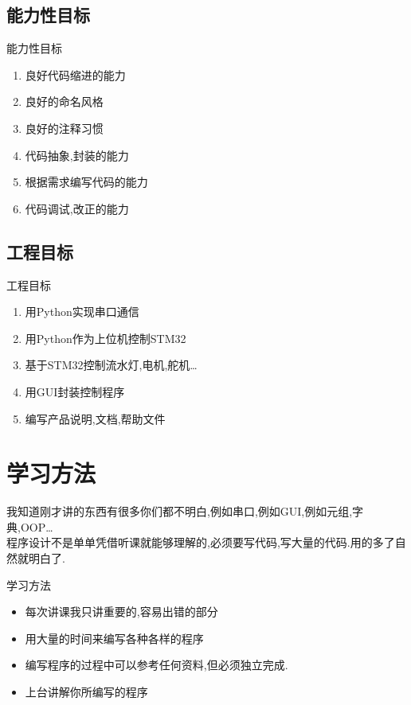 \documentclass{beamer}
\begin{document}
\subsection{能力性目标}
\begin{frame}{能力性目标}
\begin{enumerate}
\item 良好代码缩进的能力
\item 良好的命名风格
\item 良好的注释习惯
\item 代码抽象,封装的能力
\item 根据需求编写代码的能力
\item 代码调试,改正的能力

\end{enumerate}
\end{frame}

\subsection{工程目标}

\begin{frame}{工程目标}
\begin{enumerate}
\item 用Python实现串口通信
\item 用Python作为上位机控制STM32
\item 基于STM32控制流水灯,电机,舵机\dots
\item 用GUI封装控制程序
\item 编写产品说明,文档,帮助文件
\end{enumerate}
\end{frame}

\section{学习方法}
\begin{frame}
我知道刚才讲的东西有很多你们都不明白,例如串口,例如GUI,例如元组,字典,OOP\dots\\

程序设计不是单单凭借听课就能够理解的,必须要写代码,写大量的代码.用的多了自然就明白了.
\end{frame}

\begin{frame}{学习方法}
\begin{itemize}
\item 每次讲课我只讲重要的,容易出错的部分
\item 用大量的时间来编写各种各样的程序
\item 编写程序的过程中可以参考任何资料,但必须独立完成.
\item 上台讲解你所编写的程序

\end{itemize}
\end{frame}
\end{document}
